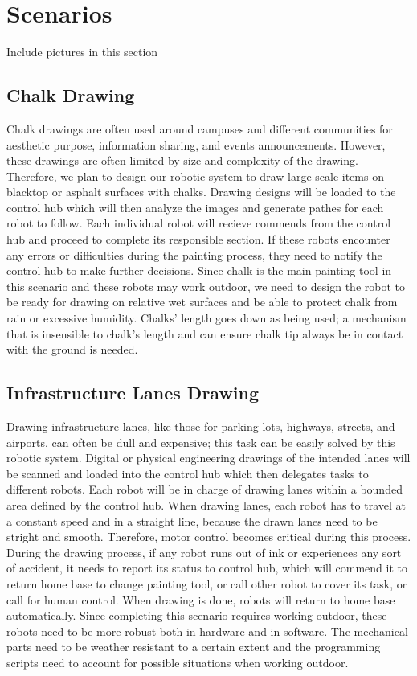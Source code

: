 
\section{Scenarios}
\label{sec:scenarios}
Include pictures in this section

\subsection{Chalk Drawing}
Chalk drawings are often used around campuses and different communities for aesthetic purpose, information sharing, and events announcements. However, these drawings are often limited by size and complexity of the drawing. Therefore, we plan to design our robotic system to draw large scale items on blacktop or asphalt surfaces with chalks. Drawing designs will be loaded to the control hub which will then analyze the images and generate pathes for each robot to follow. Each individual robot will recieve commends from the control hub and proceed to complete its responsible section. If these robots encounter any errors or difficulties during the painting process, they need to notify the control hub to make further decisions. Since chalk is the main painting tool in this scenario and these robots may work outdoor, we need to design the robot to be ready for drawing on relative wet surfaces and be able to protect chalk from rain or excessive humidity. Chalks' length goes down as being used; a mechanism that is insensible to chalk's length and can ensure chalk tip always be in contact with the ground is needed. 

\subsection{Infrastructure Lanes Drawing}
Drawing infrastructure lanes, like those for parking lots, highways, streets, and airports, can often be dull and expensive; this task can be easily solved by this robotic system. Digital or physical engineering drawings of the intended lanes will be scanned and loaded into the control hub which then delegates tasks to different robots. Each robot will be in charge of drawing lanes within a bounded area defined by the control hub. When drawing lanes, each robot has to travel at a constant speed and in a straight line, because the drawn lanes need to be stright and smooth. Therefore, motor control becomes critical during this process. During the drawing process, if any robot runs out of ink or experiences any sort of accident, it needs to report its status to control hub, which will commend it to return home base to change painting tool, or call other robot to cover its task, or call for human control. When drawing is done, robots will return to home base automatically. Since completing this scenario requires working outdoor, these robots need to be more robust both in hardware and in software. The mechanical parts need to be weather resistant to a certain extent and the programming scripts need to account for possible situations when working outdoor. 

